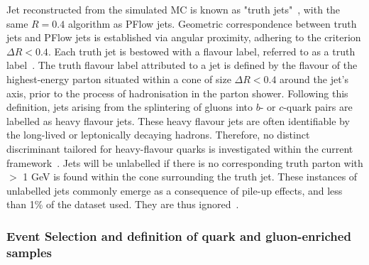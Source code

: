 Jet reconstructed from the simulated MC is known as "truth jets"~\cite{ATLAS:2020cli}, with the same \antikt $R=0.4$ algorithm as PFlow jets. Geometric correspondence between truth jets and PFlow jets is established via angular proximity, adhering to the criterion $\Delta R < 0.4$. Each truth jet is bestowed with a flavour label, referred to as a truth label~\cite{Aad_2014,ATL-PHYS-PUB-2017-009}. The truth flavour label attributed to a jet is defined by the flavour of the highest-energy parton situated within a cone of size $\Delta R < 0.4$ around the jet's axis, prior to the process of hadronisation in the parton shower. Following this definition, jets arising from the splintering of gluons into $b$- or $c$-quark pairs are labelled as heavy flavour jets. These heavy flavour jets are often identifiable by the long-lived or leptonically decaying hadrons. Therefore, no distinct discriminant tailored for heavy-flavour quarks is investigated within the current framework~\cite{CDF:2008ixu,ATLAS:2013uet}. Jets will be unlabelled if there is no corresponding truth parton with \pt $>$ 1 GeV is found within the cone surrounding the truth jet. These instances of unlabelled jets commonly emerge as a consequence of pile-up effects, and less than 1\% of the dataset used. They are thus ignored~\cite{ATLAS:2012mwf}.
 
 






\subsubsection{Event Selection and definition of quark and gluon-enriched samples}
\label{subsec:Event}

